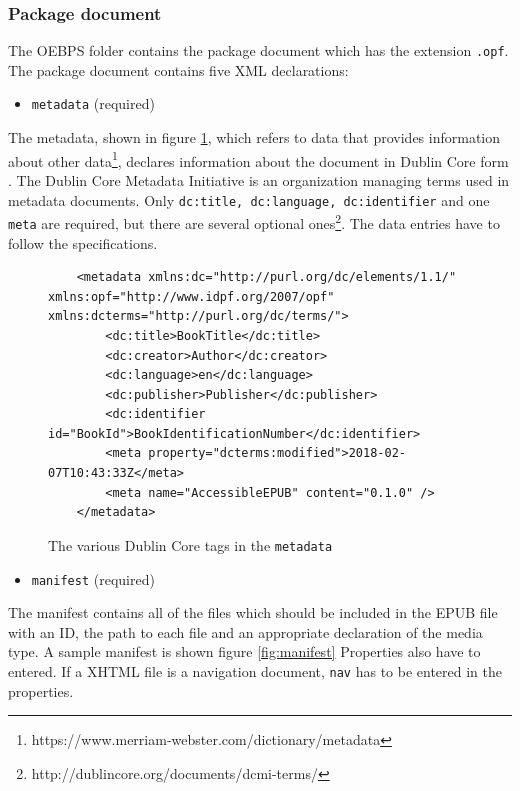 \subsubsection{Package document}

The OEBPS folder contains the package document which has the extension \lstinline{.opf}. The package document contains five XML declarations:

\begin{itemize}
	 \item \lstinline|metadata| (required)
\end{itemize}


The metadata, shown in figure \ref{fig:metadata}, which refers to data that provides information about other data\footnote{https://www.merriam-webster.com/dictionary/metadata}, declares information about the document in Dublin Core form \cite{dublinCore}. The Dublin Core Metadata Initiative is an organization managing terms used in metadata documents. Only \lstinline{dc:title, dc:language, dc:identifier} and one \lstinline{meta} are required, but there are several optional ones\footnote{http://dublincore.org/documents/dcmi-terms/}. The data entries have to follow the specifications. 

\begin{figure}
	\begin{lstlisting}
	<metadata xmlns:dc="http://purl.org/dc/elements/1.1/" xmlns:opf="http://www.idpf.org/2007/opf" xmlns:dcterms="http://purl.org/dc/terms/">
		<dc:title>BookTitle</dc:title>
		<dc:creator>Author</dc:creator>
		<dc:language>en</dc:language>
		<dc:publisher>Publisher</dc:publisher>
		<dc:identifier id="BookId">BookIdentificationNumber</dc:identifier>
		<meta property="dcterms:modified">2018-02-07T10:43:33Z</meta>
		<meta name="AccessibleEPUB" content="0.1.0" />
	</metadata>
	\end{lstlisting}
	\caption{The various Dublin Core tags in the \lstinline{metadata}}
	\label{fig:metadata}
\end{figure}

\begin{itemize}
	\item \lstinline{manifest} (required)
\end{itemize}

The manifest contains all of the files which should be included in the EPUB file with an ID, the path to each file and an appropriate declaration of the media type. A sample manifest is shown figure \ref{fig:manifest}  Properties also have to entered. If a XHTML file is a navigation document, \lstinline{nav} has to be entered in the properties.

